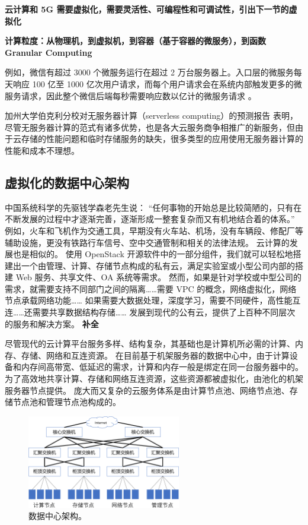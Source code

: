 \textbf{云计算和 5G 需要虚拟化，需要灵活性、可编程性和可调试性，引出下一节的虚拟化}


\textbf{计算粒度：从物理机，到虚拟机，到容器（基于容器的微服务），到函数 Granular Computing}

例如，微信有超过 3000 个微服务运行在超过 2 万台服务器上。入口层的微服务每天响应 100 亿至 1000 亿次用户请求，而每个用户请求会在系统内部触发更多的微服务请求，因此整个微信后端每秒需要响应数以亿计的微服务请求 \cite{zhou2018overload}。

加州大学伯克利分校对无服务器计算（serverless computing）的预测报告 \cite{jonas2019cloud} 表明，尽管无服务器计算的范式有诸多优势，也是各大云服务商争相推广的新服务，但由于云存储的性能问题和临时存储服务的缺失，很多类型的应用使用无服务器计算的性能和成本不理想。


\subsection{虚拟化的数据中心架构}

中国系统科学的先驱钱学森老先生说： ``任何事物的开始总是比较简陋的，只有在不断发展的过程中才逐渐完善，逐渐形成一整套复杂而又有机地结合着的体系。'' \cite{qianxuesen}
例如，火车和飞机作为交通工具，早期没有火车站、机场，没有车辆段、修配厂等辅助设施，更没有铁路行车信号、空中交通管制和相关的法律法规。
云计算的发展也是相似的。
使用 OpenStack 开源软件中的一部分组件，我们就可以轻松地搭建出一个由管理、计算、存储节点构成的私有云，满足实验室或小型公司内部的搭建 Web 服务、共享文件、OA 系统等需求。
然而，如果是针对学校或中型公司的需求，就需要支持不同部门之间的隔离……需要 VPC 的概念，网络虚拟化，网络节点承载网络功能……
如果需要大数据处理，深度学习，需要不同硬件，高性能互连……还需要共享数据结构存储……
发展到现代的公有云，提供了上百种不同层次的服务和解决方案。
\textbf{补全}

尽管现代的云计算平台服务多样、结构复杂，其基础也是计算机所必需的计算、内存、存储、网络和互连资源。
在目前基于机架服务器的数据中心中，由于计算设备和内存间高带宽、低延迟的需求，计算和内存一般是绑定在同一台服务器中的。
为了高效地共享计算、存储和网络互连资源，这些资源都被虚拟化，由池化的机架服务器节点提供。
庞大而又复杂的云服务体系是由计算节点池、网络节点池、存储节点池和管理节点池构成的。

\begin{figure}[htbp]
	\centering
	\includegraphics[width=0.6\textwidth]{figures/DC_arch.pdf}
	\caption{数据中心架构。}
	\label{background:fig:cloud-architecture}
\end{figure}

